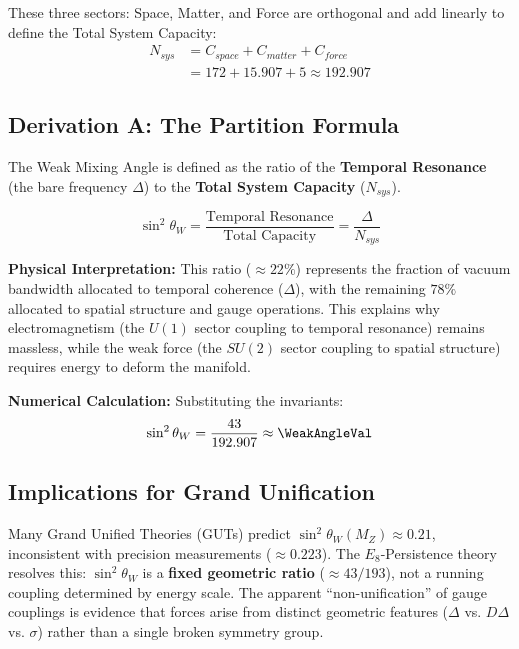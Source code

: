 These three sectors: Space, Matter, and Force are orthogonal and add linearly to define the Total System Capacity:
\begin{equation} \label{eq:system_capacity}
\begin{split}
N_{sys} &= C_{space} + C_{matter} + C_{force} \\
& = 172 + 15.907 + 5 \approx \mathbf{192.907}
\end{split}
\end{equation}

\subsection{Derivation A: The Partition Formula}
The Weak Mixing Angle is defined as the ratio of the \textbf{Temporal Resonance} (the bare frequency $\Delta$) to the \textbf{Total System Capacity} ($N_{sys}$).

\begin{equation}
\sin^2 \theta_W = \frac{\text{Temporal Resonance}}{\text{Total Capacity}} = \frac{\Delta}{N_{sys}}
\end{equation}

\textbf{Physical Interpretation:} This ratio ($\approx 22\%$) represents the fraction of vacuum bandwidth allocated to temporal coherence ($\Delta$), with the remaining $78\%$ allocated to spatial structure and gauge operations. This explains why electromagnetism (the $U(1)$ sector coupling to temporal resonance) remains massless, while the weak force (the $SU(2)$ sector coupling to spatial structure) requires energy to deform the manifold.

\textbf{Numerical Calculation:}
Substituting the invariants:
\begin{equation}
\sin^2 \theta_W = \frac{43}{192.907} \approx \mathbf{\WeakAngleVal}
\end{equation}

\subsection{Implications for Grand Unification}
Many Grand Unified Theories (GUTs) predict $\sin^2\theta_W(M_Z) \approx 0.21$, inconsistent with precision measurements ($\approx 0.223$). The $E_8$-Persistence theory resolves this: $\sin^2\theta_W$ is a \textbf{fixed geometric ratio} ($\approx43/193$), not a running coupling determined by energy scale. The apparent ``non-unification'' of gauge couplings is evidence that forces arise from distinct geometric features ($\Delta$ vs. $D\Delta$ vs. $\sigma$) rather than a single broken symmetry group.


